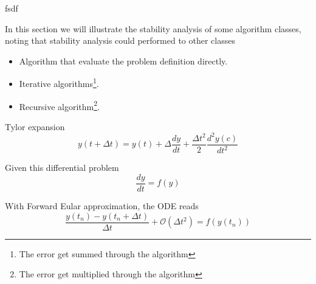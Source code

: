 \documentclass[../main.tex]{subfiles}
\begin{document}
	
	\begin{example}
		fsdf		
	\end{example}
	
	\par In this section we will illustrate the stability analysis of some algorithm classes, noting that stability analysis could performed to other classes
		\begin{itemize}
			\item Algorithm that evaluate the problem definition directly.
			\item Iterative algorithms\footnote{The error get summed through the algorithm}.
			\item Recursive algorithm\footnote{The error get multiplied through the algorithm}.
		\end{itemize}
		
		\par Tylor expansion
			\begin{equation*}
				y(t + \Delta t) = y(t) + \Delta \frac{dy}{dt} + \frac{\Delta t^2}{2} \frac{d^2y(c)}{dt^2}
			\end{equation*}
			
		\par Given this differential problem
			\begin{equation*}
				\frac{dy}{dt} = f(y)
			\end{equation*}
		\par With Forward Eular approximation, the ODE reads
		\begin{equation*}
			\frac{y(t_n) - y(t_n + \Delta t)}{\Delta t} + \mathcal{O}(\Delta t^2) = f(y(t_n))
		\end{equation*}
\end{document}
